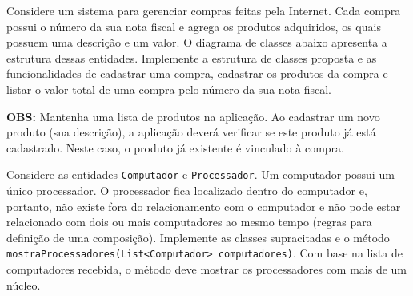 \begin{exercise}[Compras]
Considere um sistema para gerenciar compras feitas pela Internet. Cada compra possui o número da sua nota fiscal e agrega os produtos adquiridos, os quais possuem uma descrição e um valor. O diagrama de classes abaixo apresenta a estrutura dessas entidades. Implemente a estrutura de classes proposta e as funcionalidades de cadastrar uma compra, cadastrar os produtos da compra e listar o valor total de uma compra pelo número da sua nota fiscal.

\textbf{OBS:} Mantenha uma lista de produtos na aplicação. Ao cadastrar um novo produto (sua descrição), a aplicação deverá verificar se este produto já está cadastrado. Neste caso, o produto já existente é vinculado à compra.

\begin{figure}[h]
	\centering
\end{figure}
\end{exercise}

\begin{exercise}[ComputadorProcessador]
Considere as entidades \texttt{Computador} e \texttt{Processador}. Um computador possui um único processador. O processador fica localizado dentro do computador e, portanto, não existe fora do relacionamento com o computador e não pode estar relacionado com dois ou mais computadores ao mesmo tempo (regras para definição de uma composição). Implemente as classes supracitadas e o método \texttt{mostraProcessadores(List<Computador> computadores)}. Com base na lista de computadores recebida, o método deve mostrar os processadores com mais de um núcleo.

\begin{figure}[h]
	\centering
	
\end{figure}
\end{exercise}

